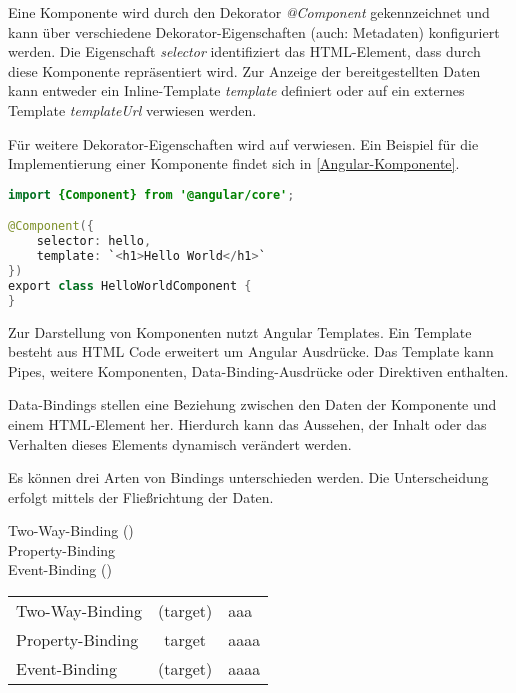 Eine Komponente wird durch den Dekorator \textit{@Component} gekennzeichnet und kann über verschiedene Dekorator-Eigenschaften (auch: Metadaten) konfiguriert werden. Die Eigenschaft \textit{selector} identifiziert das HTML-Element, dass durch diese Komponente repräsentiert wird. Zur Anzeige der bereitgestellten Daten kann entweder ein Inline-Template \textit{template} definiert oder auf ein externes Template \textit{templateUrl} verwiesen werden. \autocites[vgl.][]{Google.b}[vgl.][405]{Freeman.2018}[vgl.][47\psqq]{Steyer.2017} 

Für weitere Dekorator-Eigenschaften wird auf \textcite[405]{Freeman.2018} verwiesen. Ein Beispiel für die Implementierung einer Komponente findet sich in \autoref{Angular-Komponente}.

\begin{lstlisting}[caption=Implementierung einer Komponente, label=Angular-Komponente, language=Java]
import {Component} from '@angular/core';

@Component({
	selector: hello,
	template: `<h1>Hello World</h1>`
})
export class HelloWorldComponent {
}
\end{lstlisting}


Zur Darstellung von Komponenten nutzt Angular Templates. Ein Template besteht aus HTML Code erweitert um Angular Ausdrücke. Das Template kann Pipes, weitere Komponenten, Data-Binding-Ausdrücke oder Direktiven enthalten. \autocites[vgl.][]{Google.b}[vgl.][52]{Steyer.2017} 

Data-Bindings stellen eine Beziehung zwischen den Daten der Komponente und einem HTML-Element her. Hierdurch kann das Aussehen, der Inhalt oder das Verhalten dieses Elements dynamisch verändert werden. \autocites[vgl.][237\psqq]{Freeman.2018}[vgl.][52\psq]{Steyer.2017}

Es können drei Arten von Bindings unterschieden werden. Die Unterscheidung erfolgt mittels der Fließrichtung der Daten.
\begin{description}
	\item [Two-Way-Binding \lbrack ()\rbrack{} ] 
	\item [Property-Binding \lbrack \rbrack{} ] 
	\item [Event-Binding ()] 
\end{description}

\begin{tabular}{lcl}
	Two-Way-Binding&\lbrack (target)\rbrack{}&aaa\\ 
	Property-Binding&\lbrack target\rbrack{}&aaaa\\ 
	Event-Binding&(target)&aaaa\\ 
\end{tabular} 


